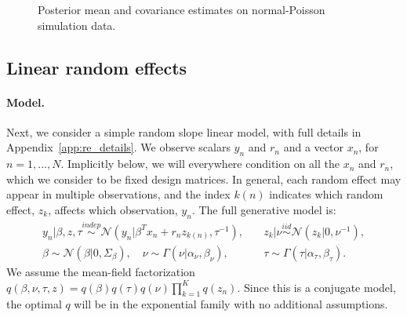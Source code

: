 \documentclass{article}\usepackage[]{graphicx}\usepackage[]{color}
\newenvironment{knitrout}{}{} %
\newcommand{\app}[1]{Appendix~\ref{app:#1}}
\newcommand{\gauss}{\mathcal{N}} %
\theoremstyle{plain}
\newcommand{\iid}{\stackrel{iid}{\sim}}
\newcommand{\indep}{\stackrel{indep}{\sim}}
\begin{document}
\begin{knitrout}
\begin{figure}[ht!]
{}

\caption[Posterior mean and covariance estimates on normal-Poisson simulation data]{Posterior mean and covariance estimates on normal-Poisson simulation data.}\label{fig:PN_SimulationResults}
\end{figure}


\end{knitrout}


\subsection{Linear random effects} \label{sec:random_effects_model}



\newcommand{\ren}{300}
\newcommand{\rensims}{100}
\newcommand{\rerenum}{30}
\newcommand{\reNuPriorAlpha}{2}
\newcommand{\reNuPriorGamma}{2}
\newcommand{\reTauPriorAlpha}{2}
\newcommand{\reTauPriorGamma}{2}
\newcommand{\reBetaPriorInfo}{0.1}
\newcommand{\reZSD}{0.4}
\newcommand{\remcmciters}{}


\paragraph{Model.}

Next, we consider a simple random slope linear model, with full details in
\app{re_details}. We observe scalars $y_n$ and $r_n$ and a vector $x_n$, for
$n=1,...,N$. Implicitly below, we will everywhere condition on all the $x_n$ and
$r_n$, which we consider to be fixed design matrices. In general, each random
effect may appear in multiple observations, and the index $k(n)$ indicates which
random effect, $z_k$, affects which observation, $y_n$.  The full generative
model is:
%
\begin{align*} y_n \vert \beta, z, \tau \indep \gauss\left(y_n \vert
\beta^T x_n + r_n z_{k(n)}, \tau^{-1}\right), &\quad z_k \vert \nu \iid
\gauss\left(z_k \vert 0, \nu^{-1}\right), \\ \beta \sim \gauss(\beta \vert 0,
\Sigma_\beta), \quad \nu \sim \Gamma(\nu \vert \alpha_\nu, \beta_\nu), &\quad
\tau \sim \Gamma(\tau \vert \alpha_\tau, \beta_\tau). \end{align*}
%
We assume the mean-field factorization $q\left(\beta,\nu,\tau,z\right) =
q\left(\beta\right) q\left(\tau\right) q\left(\nu\right) \prod_{k=1}^{K}
q\left(z_n\right)$.  Since this is a conjugate model, the optimal $q$ will be in
the exponential family with no additional assumptions.
\end{document}
